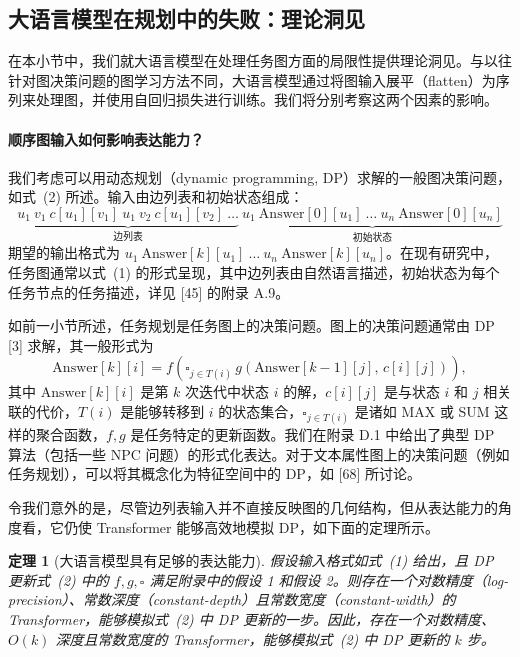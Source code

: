 \documentclass[11pt,UTF8,fontset=fandol]{ctexart}
\newtheorem{theorem}{定理}
\begin{document}
\subsection{大语言模型在规划中的失败：理论洞见}

在本小节中，我们就大语言模型在处理任务图方面的局限性提供理论洞见。与以往针对图决策问题的图学习方法不同，大语言模型通过将图输入展平（flatten）为序列来处理图，并使用自回归损失进行训练。我们将分别考察这两个因素的影响。

\paragraph{顺序图输入如何影响表达能力？}
我们考虑可以用动态规划（dynamic programming, DP）求解的一般图决策问题，如式~(2) 所述。输入由边列表和初始状态组成：
\begin{equation}
\underbrace{u_1\ v_1\ c[u_1][v_1]\ u_1\ v_2\ c[u_1][v_2]\ \ldots}_{\text{边列表}}\ \underbrace{u_1\ \mathrm{Answer}[0][u_1]\ \ldots\ u_n\ \mathrm{Answer}[0][u_n]}_{\text{初始状态}}
\end{equation}
期望的输出格式为 $u_1\ \mathrm{Answer}[k][u_1]\ \ldots\ u_n\ \mathrm{Answer}[k][u_n]$。在现有研究中，任务图通常以式~(1) 的形式呈现，其中边列表由自然语言描述，初始状态为每个任务节点的任务描述，详见 [45] 的附录 A.9。

如前一小节所述，任务规划是任务图上的决策问题。图上的决策问题通常由 DP [3] 求解，其一般形式为
\begin{equation}
\mathrm{Answer}[k][i] = f\!\left(\square_{j\in T(i)}\, g(\mathrm{Answer}[k-1][j],\, c[i][j])\right),
\end{equation}
其中 $\mathrm{Answer}[k][i]$ 是第 $k$ 次迭代中状态 $i$ 的解，$c[i][j]$ 是与状态 $i$ 和 $j$ 相关联的代价，$T(i)$ 是能够转移到 $i$ 的状态集合，$\square_{j\in T(i)}$ 是诸如 MAX 或 SUM 这样的聚合函数，$f, g$ 是任务特定的更新函数。我们在附录 D.1 中给出了典型 DP 算法（包括一些 NPC 问题）的形式化表达。对于文本属性图上的决策问题（例如任务规划），可以将其概念化为特征空间中的 DP，如 [68] 所讨论。

令我们意外的是，尽管边列表输入并不直接反映图的几何结构，但从表达能力的角度看，它仍使 Transformer 能够高效地模拟 DP，如下面的定理所示。

\begin{theorem}[大语言模型具有足够的表达能力]
假设输入格式如式~(1) 给出，且 DP 更新式~(2) 中的 $f, g, \square$ 满足附录中的假设 1 和假设 2。则存在一个对数精度（log-precision）、常数深度（constant-depth）且常数宽度（constant-width）的 Transformer，能够模拟式~(2) 中 DP 更新的一步。因此，存在一个对数精度、$O(k)$ 深度且常数宽度的 Transformer，能够模拟式~(2) 中 DP 更新的 $k$ 步。
\end{theorem}
\end{document}
